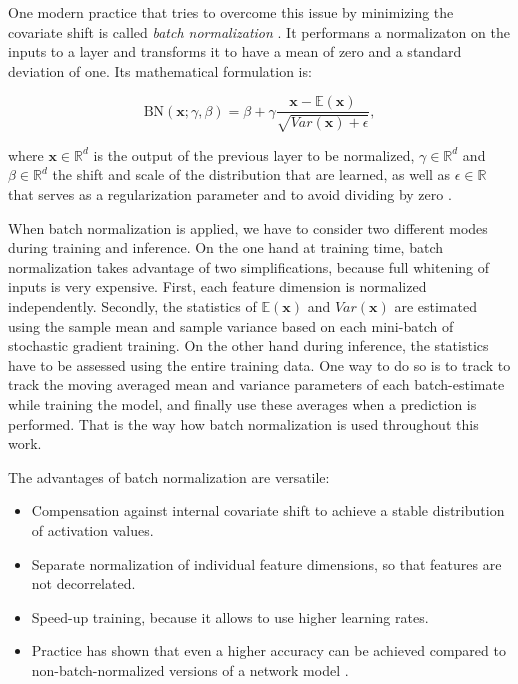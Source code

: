 One modern practice that tries to overcome this issue by minimizing the covariate shift is called \textit{batch normalization} \parencite{batchnorm}. It performans a normalizaton on the inputs to a layer and transforms it to have a mean of zero and a standard deviation of one. Its mathematical formulation is:

\begin{equation} \label{eq:bn}
\textrm{BN}(\textbf{x}; \gamma, \beta) = \beta + \gamma \frac{\textbf{x} - \mathbb{E}(\textbf{x})}{\sqrt{Var(\textbf{x}) + \epsilon}} ,
\end{equation}

where $ \textbf{x} \in \mathbb{R}^d $ is the output of the previous layer to be normalized, $\gamma \in \mathbb{R}^d $ and $\beta \in \mathbb{R}^d $ the shift and scale of the distribution that are learned, as well as $\epsilon \in \mathbb{R} $ that serves as a regularization parameter and to avoid dividing by zero \parencite{rnn-batchnorm}.

When batch normalization is applied, we have to consider two different modes during training and inference. On the one hand at training time, batch normalization takes advantage of two simplifications, because full whitening of inputs is very expensive. First, each feature dimension is normalized independently. Secondly, the statistics of $ \mathbb{E}(\textbf{x}) $ and $ Var(\textbf{x}) $ are estimated using the sample mean and sample variance based on each mini-batch of stochastic gradient training. On the other hand during inference, the statistics have to be assessed using the entire training data. One way to do so is to track to track the moving averaged mean and variance parameters of each batch-estimate while training the model, and finally use these averages when a prediction is performed. That is the way how batch normalization is used throughout this work.

The advantages of batch normalization are versatile:

\begin{itemize}
\item Compensation against internal covariate shift to achieve a stable distribution of activation values.
\item Separate normalization of individual feature dimensions, so that features are not decorrelated.
\item Speed-up training, because it allows to use higher learning rates.
\item Practice has shown that even a higher accuracy can be achieved compared to non-batch-normalized versions of a network model \parencite[p. 7]{batchnorm}.
\end{itemize}


